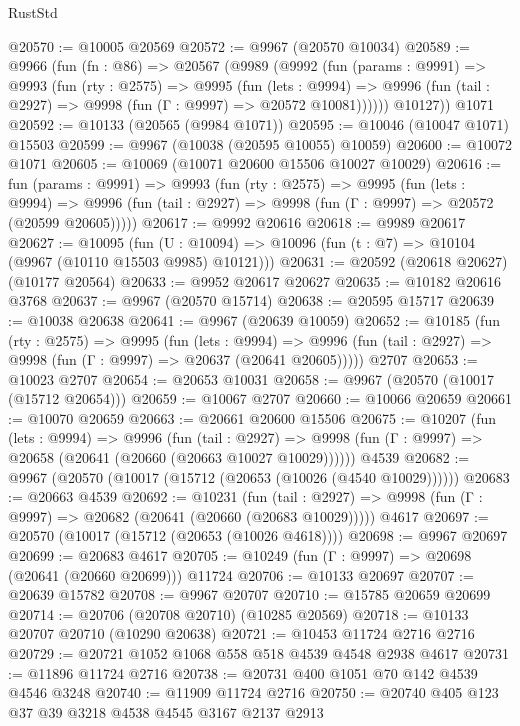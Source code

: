 \begin{lexlean}{RustStd}
\begin{coremodule}
{\begin{coremodule}
{{{{{{{{{{{{{{{{{{{{{{{{{{{{{{{{{{{{{{{{{{{{{{{{{{{{{{{{{{{{{{{{{{{{{{{{{{{{{{@20570 := @10005 @20569
@20572 := @9967 (@20570 @10034)
@20589 := @9966
    (fun (fn : @86) =>
    @20567
      (@9989
        (@9992
          (fun (params : @9991) =>
          @9993
            (fun (rty : @2575) =>
            @9995
              (fun (lets : @9994) =>
              @9996 (fun (tail : @2927) => @9998 (fun (Γ : @9997) => @20572 @10081))))))
        @10127))
    @1071
@20592 := @10133 (@20565 (@9984 @1071))
@20595 := @10046 (@10047 @1071) @15503
@20599 := @9967 (@10038 (@20595 @10055) @10059)
@20600 := @10072 @1071
@20605 := @10069 (@10071 @20600 @15506 @10027 @10029)
@20616 := fun (params : @9991) =>
  @9993
    (fun (rty : @2575) =>
    @9995
      (fun (lets : @9994) =>
      @9996 (fun (tail : @2927) => @9998 (fun (Γ : @9997) => @20572 (@20599 @20605)))))
@20617 := @9992 @20616
@20618 := @9989 @20617
@20627 := @10095
    (fun (U : @10094) => @10096 (fun (t : @7) => @10104 (@9967 (@10110 @15503 @9985) @10121)))
@20631 := @20592 (@20618 @20627) (@10177 @20564)
@20633 := @9952 @20617 @20627
@20635 := @10182 @20616 @3768
@20637 := @9967 (@20570 @15714)
@20638 := @20595 @15717
@20639 := @10038 @20638
@20641 := @9967 (@20639 @10059)
@20652 := @10185
    (fun (rty : @2575) =>
    @9995
      (fun (lets : @9994) =>
      @9996 (fun (tail : @2927) => @9998 (fun (Γ : @9997) => @20637 (@20641 @20605)))))
    @2707
@20653 := @10023 @2707
@20654 := @20653 @10031
@20658 := @9967 (@20570 (@10017 (@15712 @20654)))
@20659 := @10067 @2707
@20660 := @10066 @20659
@20661 := @10070 @20659
@20663 := @20661 @20600 @15506
@20675 := @10207
    (fun (lets : @9994) =>
    @9996
      (fun (tail : @2927) =>
      @9998 (fun (Γ : @9997) => @20658 (@20641 (@20660 (@20663 @10027 @10029))))))
    @4539
@20682 := @9967 (@20570 (@10017 (@15712 (@20653 (@10026 (@4540 @10029))))))
@20683 := @20663 @4539
@20692 := @10231
    (fun (tail : @2927) => @9998 (fun (Γ : @9997) => @20682 (@20641 (@20660 (@20683 @10029)))))
    @4617
@20697 := @20570 (@10017 (@15712 (@20653 (@10026 @4618))))
@20698 := @9967 @20697
@20699 := @20683 @4617
@20705 := @10249 (fun (Γ : @9997) => @20698 (@20641 (@20660 @20699))) @11724
@20706 := @10133 @20697
@20707 := @20639 @15782
@20708 := @9967 @20707
@20710 := @15785 @20659 @20699
@20714 := @20706 (@20708 @20710) (@10285 @20569)
@20718 := @10133 @20707 @20710 (@10290 @20638)
@20721 := @10453 @11724 @2716 @2716
@20729 := @20721 @1052 @1068 @558 @518 @4539 @4548 @2938 @4617
@20731 := @11896 @11724 @2716
@20738 := @20731 @400 @1051 @70 @142 @4539 @4546 @3248
@20740 := @11909 @11724 @2716
@20750 := @20740 @405 @123 @37 @39 @3218 @4538 @4545 @3167 @2137 @2913
}}}}}}}}}}}}}}}}}}}}}}}}}}}}}}}}}}}}}}}}}}}}}}}}}}}}}}}}}}}}}}}}}}}}}}}}}}}}}}
\end{coremodule}}
\end{coremodule}
\end{lexlean}
